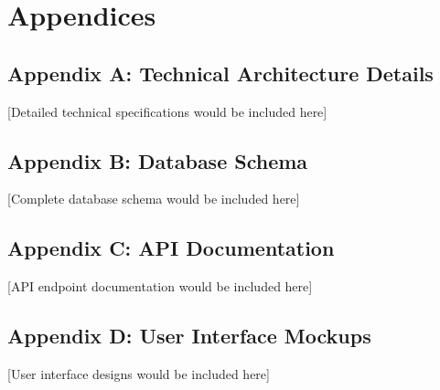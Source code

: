 \documentclass[12pt,a4paper]{article}
\begin{document}
\section{Appendices}

\subsection{Appendix A: Technical Architecture Details}

[Detailed technical specifications would be included here]

\subsection{Appendix B: Database Schema}

[Complete database schema would be included here]

\subsection{Appendix C: API Documentation}

[API endpoint documentation would be included here]

\subsection{Appendix D: User Interface Mockups}

[User interface designs would be included here]
\end{document}
